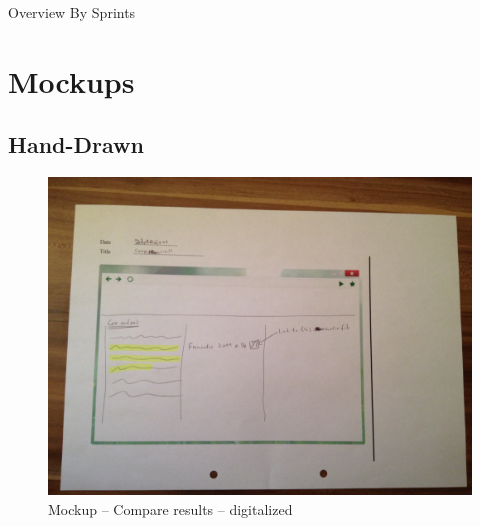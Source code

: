 \begin{appendix}
\begin{landscape}

\DTLsetseparator{,}

  \centering

\begin{table}[tbp]
  \caption{Overview By Sprints}
  \centering
\end{table}

\end{landscape}

\chapter{Mockups}\label{appendix:mockups}

\section{Hand-Drawn}

\begin{figure}[tbp]
  \centering
    \includegraphics[width=\textwidth]{mockups/m_compare_result.jpg}
  \caption{Mockup – Compare results – digitalized }
  \label{fig:mCompareResultsMockup}
\end{figure}


\end{appendix}
